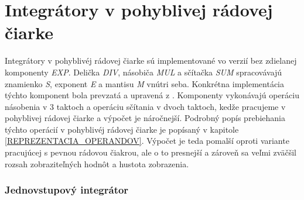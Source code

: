 

\section{Integrátory v pohyblivej rádovej čiarke}
Integrátory v pohyblivéj rádovej čiarke sú implementované vo verzií bez zdielanej komponenty \textit{EXP}. Delička \textit{DIV}, násobiča \textit{MUL} a sčítačka \textit{SUM} spracovávajú znamienko \textit{S}, exponent \textit{E} a mantisu \textit{M} vnútri seba. Konkrétna implementácia týchto komponent bola prevzatá a upravená z \cite{Guide}.  
Komponenty vykonávajú operáciu násobenia v 3 taktoch a operáciu sčítania v dvoch taktoch, kedže pracujeme v pohyblivej rádovej čiarke a výpočet je náročnejší. Podrobný popís prebiehania týchto operácií v pohyblivéj rádovej čiarke je popísaný v kapitole \ref{REPREZENTACIA_OPERANDOV}. Výpočet je teda pomalší oproti variante pracujúcej s pevnou rádovou čiakrou, ale o to presnejší a zároveň sa veľmi zväčšil rozsah zobraziteľných hodnôt a hustota zobrazenia.


\subsubsection*{Jednovstupový integrátor}

